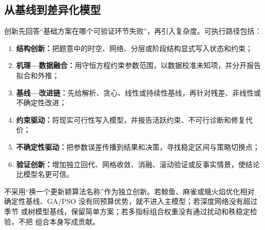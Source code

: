 \subsection{从基线到差异化模型}

创新先回答“基础方案在哪个可验证环节失败”，再引入复杂度。可执行路径包括：
\begin{enumerate}
  \item \textbf{结构创新：}把题意中的时空、网络、分层或阶段结构显式写入状态和约束；
  \item \textbf{机理—数据融合：}用守恒方程约束参数范围，以数据校准未知项，并分开报告拟合和外推；
  \item \textbf{基线—改进链：}先给解析、贪心、线性或持续性基线，再针对残差、非线性或不确定性改进；
  \item \textbf{约束驱动：}将现实可行性写入模型，并报告活跃约束、不可行诊断和修复代价；
  \item \textbf{不确定性驱动：}把参数误差传播到结果和决策，寻找稳定区间与策略切换点；
  \item \textbf{验证创新：}增加独立回代、网格收敛、消融、滚动验证或反事实情景，使结论比模型名更可信。
\end{enumerate}

不采用“换一个更新颖算法名称”作为独立创新。若鲸鱼、麻雀或蛾火焰优化相对
确定性基线、GA/PSO 没有同预算优势，就不进入主模型；若深度网络没有超过季节
或树模型基线，保留简单方案；若多指标组合权重没有通过扰动和秩稳定检验，不把
组合本身写成贡献。

